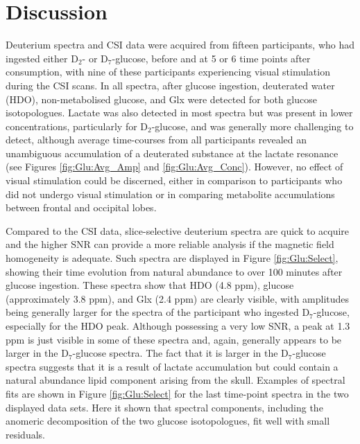 \documentclass[class=article, crop=false]{standalone}
\begin{document}
\section{Discussion}

Deuterium spectra and CSI data were acquired from fifteen participants, who had ingested either D$_2$- or D$_7$-glucose, before and at 5 or 6 time points after consumption, with nine of these participants experiencing visual stimulation during the CSI scans. In all spectra, after glucose ingestion, deuterated water (HDO), non-metabolised glucose, and Glx were detected for both glucose isotopologues. Lactate was also detected in most spectra but was present in lower concentrations, particularly for D$_2$-glucose, and was generally more challenging to detect, although average time-courses from all participants revealed an unambiguous accumulation of a deuterated substance at the lactate resonance (see Figures \ref{fig:Glu:Avg_Amp} and \ref{fig:Glu:Avg_Conc}). However, no effect of visual stimulation could be discerned, either in comparison to participants who did not undergo visual stimulation or in comparing metabolite accumulations between frontal and occipital lobes.

 Compared to the CSI data, slice-selective deuterium spectra are quick to acquire and the higher SNR can provide a more reliable analysis if the magnetic field homogeneity is adequate. Such spectra are displayed in Figure \ref{fig:Glu:Select}, showing their time evolution from natural abundance to over 100 minutes after glucose ingestion. These spectra show that HDO (4.8 ppm), glucose (approximately 3.8 ppm), and Glx (2.4 ppm) are clearly visible, with amplitudes being generally larger for the spectra of the participant who ingested D$_7$-glucose, especially for the HDO peak. Although possessing a very low SNR, a peak at 1.3 ppm is just visible in some of these spectra and, again, generally appears to be larger in the D$_7$-glucose spectra. The fact that it is larger in the D$_7$-glucose spectra suggests that it is a result of lactate accumulation but could contain a natural abundance lipid component arising from the skull. Examples of spectral fits are shown in Figure \ref{fig:Glu:Select} for the last time-point spectra in the two displayed data sets. Here it shown that spectral components, including the anomeric decomposition of the two glucose isotopologues, fit well with small residuals.

%
\end{document}
